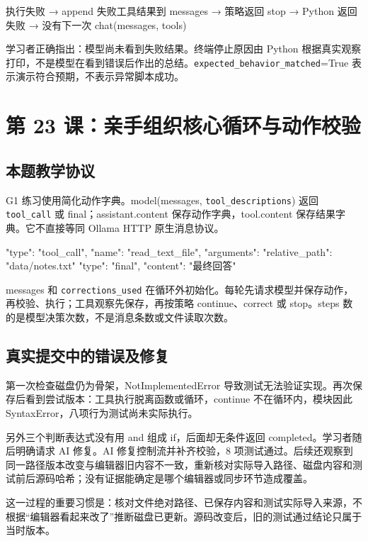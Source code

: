 \documentclass[UTF8,zihao=-4,fontset=fandol]{ctexart}
\begin{document}
\begin{Code}
执行失败
  → append 失败工具结果到 messages
  → 策略返回 stop
  → Python 返回失败
  → 没有下一次 chat(messages, tools)
\end{Code}

学习者正确指出：模型尚未看到失败结果。终端停止原因由 Python 根据真实观察打印，不是模型在看到错误后作出的总结。\nolinkurl{expected_behavior_matched}=True 表示演示符合预期，不表示异常脚本成功。

\section{第 23 课：亲手组织核心循环与动作校验}

\subsection{本题教学协议}

G1 练习使用简化动作字典。model(messages, \nolinkurl{tool_descriptions}) 返回 \nolinkurl{tool_call} 或 final；assistant.content 保存动作字典，tool.content 保存结果字典。它不直接等同 Ollama HTTP 原生消息协议。

\begin{Code}
{"type": "tool_call", "name": "read_text_file",
 "arguments": {"relative_path": "data/notes.txt"}}
{"type": "final", "content": "最终回答"}
\end{Code}

messages 和 \nolinkurl{corrections_used} 在循环外初始化。每轮先请求模型并保存动作，再校验、执行；工具观察先保存，再按策略 continue、correct 或 stop。steps 数的是模型决策次数，不是消息条数或文件读取次数。

\subsection{真实提交中的错误及修复}

第一次检查磁盘仍为骨架，NotImplementedError 导致测试无法验证实现。再次保存后看到尝试版本：工具执行脱离函数或循环，continue 不在循环内，模块因此 SyntaxError，八项行为测试尚未实际执行。

另外三个判断表达式没有用 and 组成 if，后面却无条件返回 completed。学习者随后明确请求 AI 修复。AI 修复控制流并补齐校验，8 项测试通过。后续还观察到同一路径版本改变与编辑器旧内容不一致，重新核对实际导入路径、磁盘内容和测试前后源码哈希；没有证据能确定是哪个编辑器或同步环节造成覆盖。

这一过程的重要习惯是：核对文件绝对路径、已保存内容和测试实际导入来源，不根据“编辑器看起来改了”推断磁盘已更新。源码改变后，旧的测试通过结论只属于当时版本。
\end{document}

